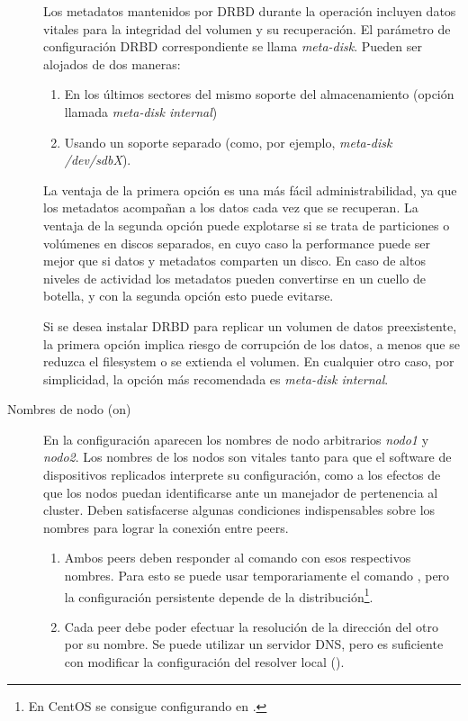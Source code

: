 \begin{description}
	Los metadatos mantenidos por DRBD durante la operación incluyen datos vitales para la integridad del volumen y su recuperación. El parámetro de configuración DRBD correspondiente se llama \textit{meta-disk}. Pueden ser alojados de dos maneras:

\begin{enumerate}
	\item En los últimos sectores del mismo soporte del almacenamiento (opción llamada \textit{meta-disk internal})
	\item Usando un soporte separado (como, por ejemplo, \textit{meta-disk /dev/sdbX}). 
\end{enumerate}

La ventaja de la primera opción es una más fácil administrabilidad, ya que los metadatos acompañan a los datos cada vez que se recuperan. La ventaja de la segunda opción puede explotarse si se trata de particiones o volúmenes en discos separados, en cuyo caso la performance puede ser mejor que si datos y metadatos comparten un disco. En caso de altos niveles de actividad los metadatos pueden convertirse en un cuello de botella, y con la segunda opción esto puede evitarse. 

Si se desea instalar DRBD para replicar un volumen de datos preexistente, la primera opción implica riesgo de corrupción de los datos, a menos que se reduzca el filesystem o se extienda el volumen. En cualquier otro caso, por simplicidad, la opción más recomendada es \textit{meta-disk internal}.

\item [Nombres de nodo (on)]
En la configuración aparecen los nombres de nodo arbitrarios \textit{nodo1} y \textit{nodo2}. Los nombres de los nodos son vitales tanto para que el software de dispositivos replicados interprete su configuración, como a los efectos de que los nodos puedan identificarse ante un manejador de pertenencia al cluster. Deben satisfacerse algunas condiciones indispensables sobre los nombres para lograr la conexión entre peers. 

\begin{enumerate}
	\item Ambos peers deben responder al comando  con esos respectivos nombres.  Para esto se puede usar temporariamente el comando , pero la configuración persistente depende de la distribución\footnote{En CentOS se consigue configurando  en .}.
	\item Cada peer debe poder efectuar la resolución de la dirección del otro por su nombre. Se puede utilizar un servidor DNS, pero es suficiente con modificar la configuración del resolver local ().
\end{enumerate}


\end{description}
